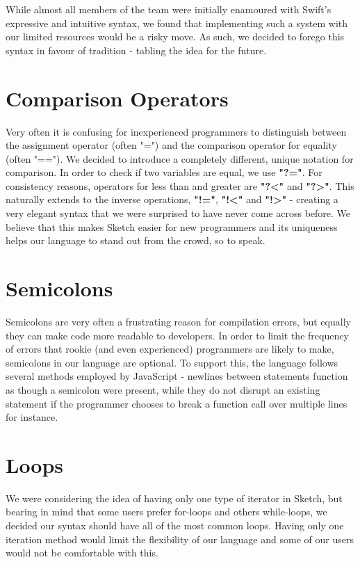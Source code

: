 \documentclass{l3proj}
\begin{document}
While almost all members of the team were initially enamoured with Swift's expressive and intuitive syntax, we found that implementing such a system with our limited resources would be a risky move. As such, we decided to forego this syntax in favour of tradition - tabling the idea for the future.

\section{Comparison Operators}
Very often it is confusing for inexperienced programmers to distinguish between the assignment operator (often "=") and the comparison operator for equality (often "=="). We decided to introduce a completely different, unique notation for comparison. In order to check if two variables are equal, we use \textbf{"?="}. For consistency reasons, operators for less than and greater are \textbf{"?\textless"} and \textbf{"?\textgreater"}. This naturally extends to the inverse operations, \textbf{"!="}, \textbf{"!\textless{}"} and \textbf{"!\textgreater{}"} - creating a very elegant syntax that we were surprised to have never come across before. We believe that this makes Sketch easier for new programmers and its uniqueness helps our language to stand out from the crowd, so to speak.

\section {Semicolons}
Semicolons are very often a frustrating reason for compilation errors, but equally they can make code more readable to developers. In order to limit the frequency of errors that rookie (and even experienced) programmers are likely to make, semicolons in our language are optional. To support this, the language follows several methods employed by JavaScript - newlines between statements function as though a semicolon were present, while they do not disrupt an existing statement if the programmer chooses to break a function call over multiple lines for instance.

\section {Loops}
We were considering the idea of having only one type of iterator in Sketch, but bearing in mind that some users prefer for-loops and others while-loops, we decided our syntax should have all of the most common loops. Having only one iteration method would limit the flexibility of our language and some of our users would not be comfortable with this.
 
\end{document}
